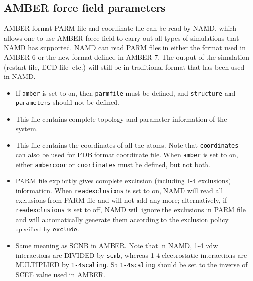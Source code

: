\subsection{AMBER force field parameters}

AMBER format PARM file and coordinate file can be read by NAMD,
which allows one to use AMBER force field to carry out all types
of simulations that NAMD has supported. NAMD can read PARM files
in either the format used in AMBER 6 or the new format
defined in AMBER 7. The output of
the simulation (restart file, DCD file, etc.) will still be in
traditional format that has been used in NAMD.

\begin{itemize}

\item
{}
{
If {\tt amber} is set to on, then {\tt parmfile} must be defined,
and {\tt structure} and {\tt parameters} should not be defined.
}

\item
{}
{
This file contains complete topology and parameter information of
the system.
}

\item
{}
{
This file contains the coordinates of all the atoms. Note that
{\tt coordinates} can also be used for PDB format coordinate
file. When {\tt amber} is set to on, either {\tt ambercoor}
or {\tt coordinates} must be defined, but not both.
}

\item
{}
{
PARM file explicitly gives complete exclusion (including 1-4
exclusions) information. When {\tt readexclusions} is set to on,
NAMD will read all exclusions from PARM file and will not add any
more; alternatively, if {\tt readexclusions} is set to
off, NAMD will ignore the exclusions in PARM file and will
automatically generate them according to the
exclusion policy specified by {\tt exclude}.
}

\item
{}
{
Same meaning as SCNB in AMBER. Note that in NAMD, 1-4 vdw
interactions are DIVIDED by {\tt scnb}, whereas 1-4 electrostatic
interactions are MULTIPLIED by {\tt 1-4scaling}. So
{\tt 1-4scaling} should be set to the inverse of SCEE value used
in AMBER.
}

\end{itemize}

